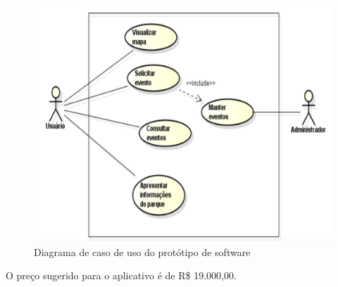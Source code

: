 \begin{anexosenv}
\begin{figure}[H]
	\centering
	\label{DiagramaCasoUso}
		\includegraphics[keepaspectratio=true,scale=0.7]{figuras/DiagramaCasoUso.png}
	\caption{Diagrama de caso de uso do protótipo de software}
\end{figure}

O preço sugerido para o aplicativo é de R\$ 19.000,00. \cite{quantocustaumapp}

\end{anexosenv}


